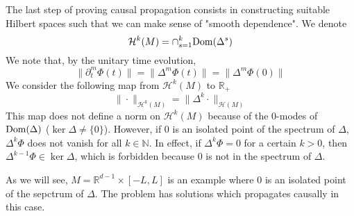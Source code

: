%
The last step of proving causal propagation consists in constructing suitable Hilbert spaces such that we can make sense of "smooth dependence". 
We denote 
\begin{equation*}
\mathcal{H}^k(M) = \cap_{s=1}^{k} \mathrm{Dom}(\Delta^s)
\end{equation*}
We note that, by the unitary time evolution, 
\begin{equation*}
\big\|\partial_t^m \Phi(t) \big\|= 
\big\|\Delta^m\Phi(t) \big\| =
\big\|\Delta^m \Phi(0) \big\|
\end{equation*} 
We consider the following map from $\mathcal{H}^k(M)$ to $\mathbb{R}_+$
\begin{equation}\label{wen-hilbertnorm}
\| \cdot \|_{\mathcal{H}^k(M)} = \| \Delta^k \cdot \|_{\mathcal{H}(M)}
\end{equation}
This map does not define a norm on $\mathcal{H}^k(M)$ because of the 0-modes of $\mathrm{Dom}(\Delta)$ ($\ker \Delta \neq \{0\}$).
However, 
if 0 is an isolated point of the spectrum of $\Delta$, $\Delta^k \Phi$ does not vanish for all $k\in\mathbb{N}$.
In effect, 
if $\Delta^k \Phi = 0$ for a certain $k>0$,
then $\Delta^{k-1}\Phi\in\ker\Delta$, which is forbidden because $0$ is not in the spectrum of $\Delta$.
%
\begin{remark}
As we will see, $M = \mathbb{R}^{d-1}\times[-L,L]$ is an example where 0 is an isolated point of the sepctrum of $\Delta$. 
The problem has solutions which propagates causally in this case.
\end{remark}
%
%




